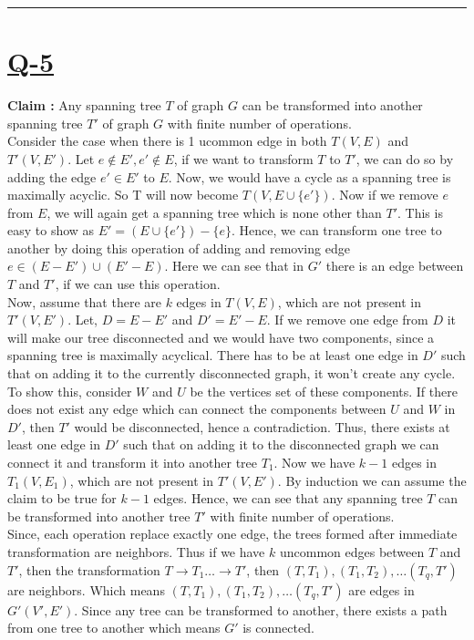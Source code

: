 \documentclass[14pt]{article}
\begin{document}
	\vspace{2cm}
	\hrule
	\vspace{0.5cm}
	
	\section*{\underline{Q-5}}
		\noindent
		\linebreak
		\textbf{Claim : }Any spanning tree $T$ of graph $G$ can be transformed into another spanning tree $T'$ of graph $G$ with finite number of operations.\\
		\linebreak
		Consider the case when there is 1 ucommon edge in both $T(V, E)$ and $T'(V, E')$. Let $e \notin E', e' \notin E$, if we want to transform $T$ to $T'$, we can do so by adding the edge $e'\in E'$ to $E$. Now, we would have a cycle as a spanning tree is maximally acyclic. So T will now become $T(V, E \cup \{e'\})$. Now if we remove $e$ from $E$, we will again get a spanning tree which is none other than $T'$. This is easy to show as $E' = (E \cup \{e'\}) - \{e\}$. Hence, we can transform one tree to another by doing this operation of adding and removing edge $e \in (E - E') \cup (E' - E)$. Here we can see that in $G'$ there is an edge between $T$ and $T'$, if we can use this operation.\\
		\linebreak
		Now, assume that there are $k$ edges in $T(V, E)$, which are not present in $T'(V, E')$. Let, $D = E-E'$ and $D' = E'-E$. If we remove one edge from $D$ it will make our tree disconnected and we would have two components, since a spanning tree is maximally acyclical. There has to be at least one edge in $D'$ such that on adding it to the currently disconnected graph, it won't create any cycle. To show this, consider $W$ and $U$ be the vertices set of these components. If there does not exist any edge which can connect the components between $U$ and $W$ in $D'$, then $T'$ would be disconnected, hence a contradiction. Thus, there exists at least one edge in $D'$ such that on adding it to the disconnected graph we can connect it and transform it into another tree $T_1$. Now we have $k-1$ edges in $T_1(V, E_1)$, which are not present in $T'(V, E')$. By induction we can assume the claim to be true for $k-1$ edges. Hence, we can see that any spanning tree $T$ can be transformed into another tree $T'$ with finite number of operations.\\
		\linebreak
		Since, each operation replace exactly one edge, the trees formed after immediate transformation are neighbors. Thus if we have $k$ uncommon edges between $T$ and $T'$, then the transformation $T \rightarrow T_1 \dots \rightarrow T'$, then $(T, T_1), (T_1, T_2), \dots (T_q, T')$ are neighbors. Which means $(T, T_1), (T_1, T_2), \dots (T_q, T')$ are edges in $G'(V', E')$. Since any tree can be transformed to another, there exists a path from one tree to another which means $G'$ is connected.
 		
\end{document}
